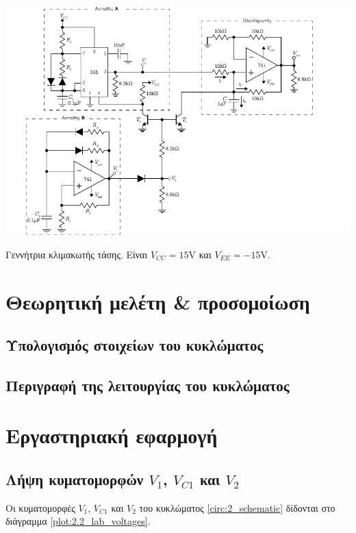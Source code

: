 \begin{center}
	\begin{circuitfig}[H]
		\includegraphics[width=14cm]{circuits/micro3_lab2.pdf}
		\caption{Γεννήτρια κλιμακωτής τάσης. Είναι $V_{CC}=15\unit{\volt}$ και $V_{EE}=-15\unit{\volt}$.}
		\label{circ:2_schematic}
	\end{circuitfig}
\end{center}

\section{Θεωρητική μελέτη \& προσομοίωση}

	\subsection{Υπολογισμός στοιχείων του κυκλώματος}
		

	\subsection{Περιγραφή της λειτουργίας του κυκλώματος}
		

\section{Εργαστηριακή εφαρμογή}

	\subsection{Λήψη κυματομορφών $V_1$, $V_{C1}$ και $V_2$}
		Οι κυματομορφές $V_1$, $V_{C1}$ και $V_2$ του κυκλώματος \ref{circ:2_schematic}  δίδονται στο διάγραμμα \ref{plot:2.2_lab_voltages}.

